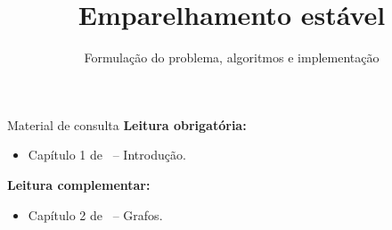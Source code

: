 \newcommand{\defs}{../defs}


\title[Emparalhamento estável]{Emparelhamento estável}
\subtitle{Formulação do problema, algoritmos e implementação}



\maketitle

\begin{frame}{Material de consulta}
	\textbf{Leitura obrigatória:}
	\begin{itemize}
		\item Capítulo 1 de~\cite{KleinbergAndTardos2006} -- Introdução.
	\end{itemize}
	
	\bigskip
	
	\textbf{Leitura complementar:}
	\begin{itemize}
		\item Capítulo 2 de~\cite{KleinbergAndTardos2006} -- Grafos.
	\end{itemize}
\end{frame}


